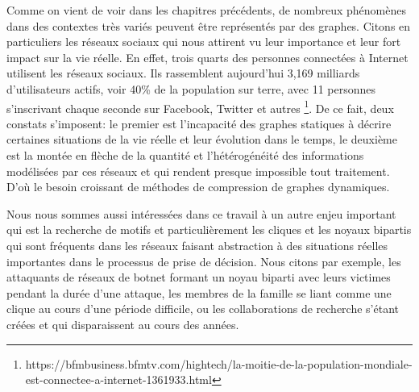 

Comme on vient de voir dans les chapitres précédents, de nombreux phénomènes dans des contextes très variés peuvent être représentés par des graphes. Citons en particuliers les réseaux sociaux qui nous attirent vu leur importance et leur fort impact sur la vie réelle. En effet, trois quarts des personnes connectées à Internet utilisent les réseaux sociaux. Ils rassemblent aujourd'hui 3,169 milliards d'utilisateurs actifs, voir 40\% de la population sur terre, avec 11 personnes s'inscrivant chaque seconde sur Facebook, Twitter et autres
\footnote{https://bfmbusiness.bfmtv.com/hightech/la-moitie-de-la-population-mondiale-est-connectee-a-internet-1361933.html}. De ce fait, deux constats s'imposent: le premier est l'incapacité des graphes statiques à décrire certaines situations de la vie réelle et leur évolution dans le temps, le deuxième est la montée en flèche de la quantité et l'hétérogénéité des informations modélisées par ces réseaux et qui rendent presque impossible tout traitement. D'où le besoin croissant de méthodes de compression de graphes dynamiques. 

Nous nous sommes aussi intéressées dans ce travail à un autre enjeu important qui est la recherche de motifs et particulièrement les cliques et les noyaux bipartis qui sont fréquents dans les réseaux faisant abstraction à des situations réelles importantes dans le processus de prise de décision. Nous citons par exemple, les attaquants de réseaux de botnet formant un noyau biparti avec leurs victimes pendant la durée d'une attaque, les membres de la famille se liant comme une clique au cours d'une période difficile, ou les collaborations de recherche s'étant créées et qui disparaissent au cours des années.


